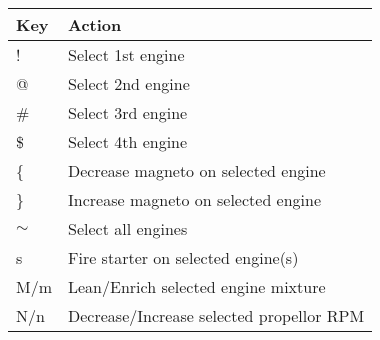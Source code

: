 \begin{tabular}{|l|l|}\hline
Key      &  Action\\ \hline
   !     & Select 1st engine\\
   @	 & Select 2nd engine\\
  \#     & Select 3rd engine\\
  \$     & Select 4th engine\\
  \{     & Decrease magneto on selected engine\\
  \}     & Increase magneto on selected engine\\
  $\sim$ & Select all engines\\\hline
   s     & Fire starter on selected engine(s)\\
  M/m    & Lean/Enrich selected engine mixture\\
  N/n    & Decrease/Increase selected propellor RPM\\\hline
\end{tabular}

